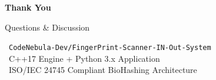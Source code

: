 \documentclass[aspectratio=169, 11pt]{beamer}
\begin{document}
\begin{frame}[plain]
  \begin{center}
    \vspace{2cm}
    {\Huge\bfseries\textcolor{PrimaryBlue}{Thank You}}

    \vspace{0.8cm}
    {\Large Questions \& Discussion}

    \vspace{1.2cm}
    {\small
      \ \texttt{CodeNebula-Dev/FingerPrint-Scanner-IN-Out-System}\\[0.4em]
      \ C++17 Engine + Python 3.x Application\\[0.4em]
      \ ISO/IEC 24745 Compliant BioHashing Architecture
    }
  \end{center}
\end{frame}
\end{document}
